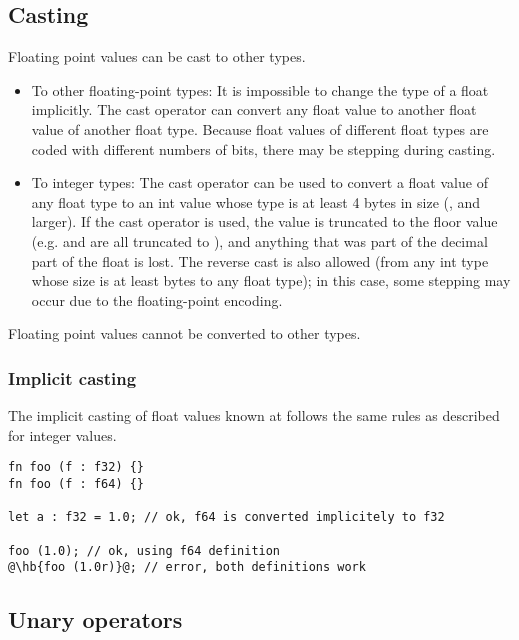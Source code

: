 \subsection{Casting}
\label{sec:org9eacb07}

Floating point values can be cast to other types.

\begin{itemize}
\item To other floating-point types: It is impossible to change the type of a
  float implicitly. The cast operator  can convert any float
  value to another float value of another float type. Because float values of
  different float types are coded with different numbers of bits, there may be
  stepping during casting.

\item To integer types: The cast operator can be used to convert a float value
  of any float type to an int value whose type is at least 4 bytes in size
  (,  and larger). If the cast operator is used, the
  value is truncated to the floor value (e.g.   and
   are all truncated to ), and anything that was part of
  the decimal part of the float is lost. The reverse cast is also allowed (from
  any int type whose size is at least  bytes to any float type); in
  this case, some stepping may occur due to the floating-point encoding.

\end{itemize}

Floating point values cannot be converted to other types.
\subsubsection{Implicit casting}

The implicit casting of float values known at  follows the same
rules as described for integer  values.

\begin{lstlisting}[style=coloredverbatim, escapechar=@]
fn foo (f : f32) {}
fn foo (f : f64) {}

let a : f32 = 1.0; // ok, f64 is converted implicitely to f32

foo (1.0); // ok, using f64 definition
@\hb{foo (1.0r)}@; // error, both definitions work
\end{lstlisting}

\subsection{Unary operators}
\label{sec:org30770bf}

